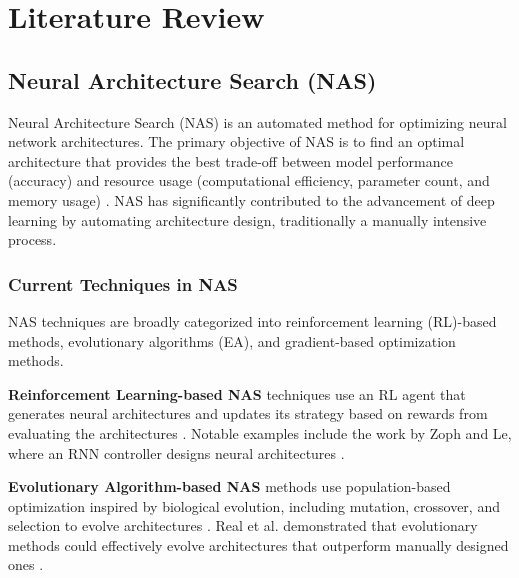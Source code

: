 
\chapter{Literature Review} %

\label{LiteratureReview} %


\section{Neural Architecture Search (NAS)}

Neural Architecture Search (NAS) is an automated method for optimizing neural network architectures. The primary objective of NAS is to find an optimal architecture that provides the best trade-off between model performance (accuracy) and resource usage (computational efficiency, parameter count, and memory usage) \cite{elsken2019neural}. NAS has significantly contributed to the advancement of deep learning by automating architecture design, traditionally a manually intensive process.
\subsection{Current Techniques in NAS}

NAS techniques are broadly categorized into reinforcement learning (RL)-based methods, evolutionary algorithms (EA), and gradient-based optimization methods.

\textbf{Reinforcement Learning-based NAS} techniques use an RL agent that generates neural architectures and updates its strategy based on rewards from evaluating the architectures \cite{zoph2016neural}. Notable examples include the work by Zoph and Le, where an RNN controller designs neural architectures \cite{zoph2016neural}.

\textbf{Evolutionary Algorithm-based NAS} methods use population-based optimization inspired by biological evolution, including mutation, crossover, and selection to evolve architectures \cite{real2019regularized}. Real et al. demonstrated that evolutionary methods could effectively evolve architectures that outperform manually designed ones \cite{real2019regularized}.

